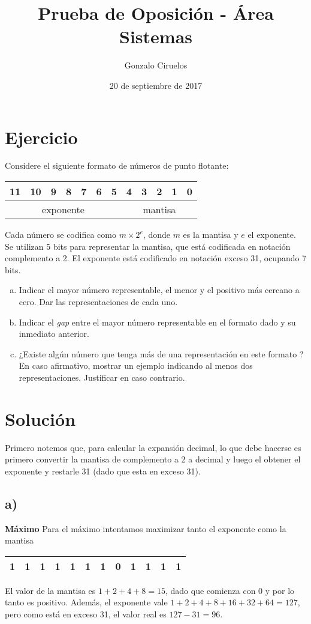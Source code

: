 \documentclass[hidelinks,a4paper,10pt, nofootinbib]{article}
\title{Prueba de Oposición - Área Sistemas}
\author{Gonzalo Ciruelos}
\date{20 de septiembre de 2017}
\begin{document}
\maketitle

\section*{Ejercicio}
Considere el siguiente formato de números de punto flotante:
\begin{center}
\begin{tabular}{|c|c|c|c|c|c|c|c|c|c|c|c|}
 11 & 10 & 9 & 8 & 7 & 6 & 5 & 4 & 3 & 2 & 1 & 0 \\ \hline
 \multicolumn{7}{|c|}{exponente} & \multicolumn{5}{c|}{mantisa} \\ \hline
\end{tabular}
\end{center}

Cada número se codifica como $m \times 2^e$, donde $m$ es la mantisa y $e$ el exponente. Se utilizan 5 bits para representar la mantisa, que está codificada en notación complemento a 2. El exponente está codificado en notación exceso 31, ocupando 7 bits.

\begin{enumerate}[a)]
    \item Indicar el mayor número representable, el menor y el positivo más cercano a cero. Dar las representaciones de cada uno.
    \item Indicar el \emph{gap} entre el mayor número representable en el formato dado y su inmediato anterior. 
    \item ¿Existe algún número que tenga más de una representación en este formato ? En caso afirmativo, mostrar un ejemplo indicando al menos dos representaciones. Justificar en caso contrario.
\end{enumerate}

\section*{Solución}
Primero notemos que, para calcular la expansión decimal, lo que debe hacerse es primero convertir la mantisa de complemento a 2 a decimal y luego el obtener el exponente y restarle 31 (dado que esta en exceso 31).

\subsection*{a)}
\textbf{Máximo} Para el máximo intentamos maximizar tanto el exponente como la mantisa
\begin{center}
\begin{tabular}{|c|c|c|c|c|c|c||c|c|c|c|c|}
\hline
1&1&1&1&1&1&1&0&1&1&1&1\\
\hline
\end{tabular}
\end{center}
El valor de la mantisa es $1+2+4+8 = 15$, dado que comienza con $0$ y por lo tanto es positivo.
Además, el exponente vale $1+2+4+8+16+32+64 = 127$, pero como está en exceso 31, el valor real es $127 - 31 = 96$.
\end{document}
